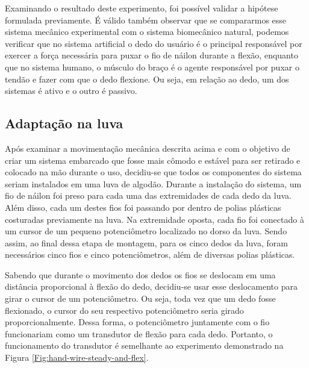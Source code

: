 \documentclass[
	12pt,				%
	openright,			%
	oneside,			%
	a4paper,			%
	english,			%
	brazil				%
	]{abntex2}
\begin{document}
		Examinando o resultado deste experimento, foi possível validar a hipótese formulada previamente. É válido também observar que se compararmos esse sistema mecânico experimental com o sistema biomecânico natural, podemos verificar que no sistema artificial o dedo do usuário é o principal responsável por exercer a força necessária para puxar o fio de náilon durante a flexão, enquanto que no sistema humano, o músculo do braço é o agente responsável por puxar o tendão e fazer com que o dedo flexione. Ou seja, em relação ao dedo, um dos sistemas é ativo e o outro é passivo.


		\subsection{Adaptação na luva} \label{sub:adaptacao-na-luva}





		Após examinar a movimentação mecânica descrita acima e com o objetivo de criar um sistema embarcado que fosse mais cômodo e estável para ser retirado e colocado na mão durante o uso, decidiu-se que todos os componentes do sistema seriam instalados em uma luva de algodão. Durante a instalação do sistema, um fio de náilon foi preso para cada uma das extremidades de cada dedo da luva. Além disso, cada um destes fios foi passando por dentro de polias plásticas costuradas previamente na luva. Na extremidade oposta, cada fio foi conectado à um cursor de um pequeno potenciômetro localizado no dorso da luva. Sendo assim, ao final dessa etapa de montagem, para os cinco dedos da luva, foram necessários cinco fios e cinco potenciômetros, além de diversas polias plásticas.

		Sabendo que durante o movimento dos dedos os fios se deslocam em uma distância proporcional à flexão do dedo, decidiu-se usar esse deslocamento para girar o cursor de um potenciômetro. Ou seja, toda vez que um dedo fosse flexionado, o cursor do seu respectivo potenciômetro seria girado proporcionalmente. Dessa forma, o potenciômetro juntamente com o fio funcionariam como um transdutor de flexão para cada dedo. Portanto, o funcionamento do transdutor é semelhante ao experimento demonstrado na Figura \ref{Fig:hand-wire-steady-and-flex}. 
		
\end{document}
